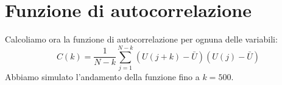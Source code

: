 \documentclass[a4paper,10pt]{article}
\begin{document}
\section{Funzione di autocorrelazione}
Calcoliamo ora la funzione di autocorrelazione per ognuna delle variabili:
\begin{equation}
C(k)=\frac{1}{N-k} \sum_{j=1}^{N-k} (U(j+k)-\bar{U})(U(j)-\bar{U})
\end{equation}
Abbiamo simulato l'andamento della funzione fino a $k=500$. \\
\begin{figure}[H]
	\centering 
	\qquad\qquad
	\qquad\qquad
	\qquad\qquad
	\qquad\qquad
\end{figure}
\end{document}
